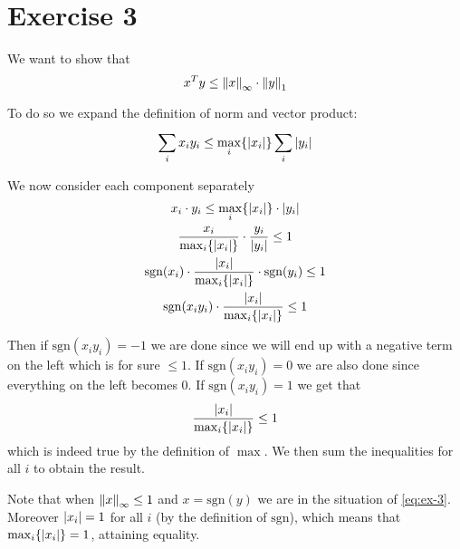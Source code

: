 \documentclass[12pt]{extarticle}
\numberwithin{equation}{section}
\begin{document}
\section*{Exercise 3}

We want to show that
\begin{equation}
	x^T y \leq \norm{x}_\infty \cdot \norm{y}_1
\end{equation}

To do so we expand the definition of norm and vector product:
\begin{equation}
	\sum_{i} x_i y_i \leq \max_{i} \{ \abs{x_i} \} \sum_{i}^{} \abs{y_i}
\end{equation}

We now consider each component separately
\begin{gather}
	x_i \cdot y_i \leq \max_i \{\abs{x_i}\} \cdot \abs{y_i} \\
	\frac{x_i}{\max_i \{ \abs{x_i} \}} \cdot \frac{y_i}{\abs{y_i}} \leq 1 \\
	\mathrm{sgn} (x_i) \cdot \frac{\abs{x_i}}{\max_i \{ \abs{x_i} \}} \cdot \mathrm{sgn}(y_i) \leq 1 \\
	\mathrm{sgn} (x_i y_i) \cdot \frac{\abs{x_i}}{\max_i \{ \abs{x_i} \}} \leq 1
\end{gather}

Then if $\mathrm{sgn}(x_i y_i) = -1$ we are done since we will end up with a negative term on the
left which is for sure $\leq 1$. If $\mathrm{sgn}(x_i y_i) = 0$ we are also done since everything on
the left becomes $0$. If $\mathrm{sgn}(x_i y_i) = 1$ we get that
\begin{equation}
	\frac{\abs{x_i}}{\max_i \{ \abs{x_i} \}} \leq 1 \label{eq:ex-3}
\end{equation}
which is indeed true by the definition of $\max$.
We then sum the inequalities for all $i$ to obtain the result.

Note that when $\norm{x}_\infty \leq 1$ and $x = \mathrm{sgn}(y)$ we are in the situation of
\cref{eq:ex-3}. Moreover $\abs{x_i} = 1$ for all $i$ (by the definition of $\mathrm{sgn}$), which
means that $\max_i \{ \abs{x_i} \} = 1$, attaining equality.
\end{document}
